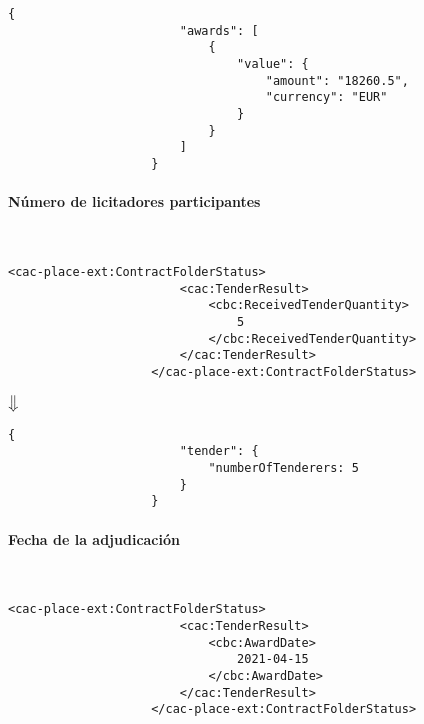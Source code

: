                 \begin{lstlisting}[language=lJSON]
                    {
                        "awards": [
                            {
                                "value": {
                                    "amount": "18260.5",
                                    "currency": "EUR"
                                }
                            }
                        ]
                    }
                \end{lstlisting}
                
            \paragraph{Número de licitadores participantes} \mbox{}\\
                \begin{lstlisting}[language=lXML]
                    <cac-place-ext:ContractFolderStatus>
                        <cac:TenderResult>
                            <cbc:ReceivedTenderQuantity>
                                5
                            </cbc:ReceivedTenderQuantity>
                        </cac:TenderResult>
                    </cac-place-ext:ContractFolderStatus>
                \end{lstlisting}
                
                \begin{center}
                    $\big\Downarrow$
                \end{center}
                
                \begin{lstlisting}[language=lJSON]
                    {
                        "tender": {
                            "numberOfTenderers: 5
                        }
                    }
                \end{lstlisting}
                
            \paragraph{Fecha de la adjudicación} \mbox{}\\
                \begin{lstlisting}[language=lXML]
                    <cac-place-ext:ContractFolderStatus>
                        <cac:TenderResult>
                            <cbc:AwardDate>
                                2021-04-15
                            </cbc:AwardDate>
                        </cac:TenderResult>
                    </cac-place-ext:ContractFolderStatus>
                \end{lstlisting}
                
